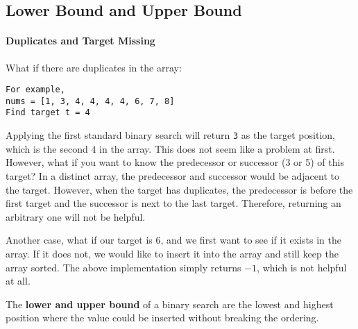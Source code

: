\documentclass[main.tex]{subfiles}
\begin{document}
\subsection{Lower Bound and Upper Bound}
\paragraph{Duplicates and Target Missing} What if there are duplicates in the array:
\begin{lstlisting}[numbers=none]
For example, 
nums = [1, 3, 4, 4, 4, 4, 6, 7, 8]
Find target t = 4
\end{lstlisting}
Applying the first standard binary search will return \texttt{3} as the target position, which is the second $4$ in the array. This does not seem like a problem at first. However, what if you want to know the predecessor or successor (3 or 5) of this target? In a distinct array, the predecessor and successor would be adjacent to the target. However, when the target has duplicates, the predecessor is  before the first target and the successor is next to the last target. Therefore, returning an arbitrary one will not be helpful. 

Another case, what if our target is 6, and we first want to see if it exists in the array. If it does not, we would like to insert it into the array and still keep the array sorted. The above implementation simply returns $-1$, which is not helpful at all. 

The \textbf{lower and upper bound} of a binary search are the lowest and highest position where the value could be inserted without breaking the ordering. 
\end{document}
